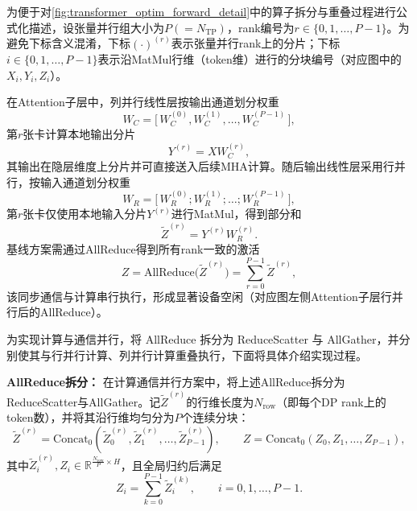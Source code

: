 为便于对\autoref{fig:transformer_optim_forward_detail}中的算子拆分与重叠过程进行公式化描述，设张量并行组大小为$P(=N_{\mathrm{TP}})$，rank编号为$r\in\{0,1,\ldots,P-1\}$。为避免下标含义混淆，下标$(\cdot)^{(r)}$表示张量并行rank上的分片；下标$i\in\{0,1,\ldots,P-1\}$表示沿MatMul行维（token维）进行的分块编号（对应图中的$X_i,Y_i,Z_i$）。

在Attention子层中，列并行线性层按输出通道划分权重
\begin{equation}
W_C=\big[\,W_C^{(0)},W_C^{(1)},\ldots,W_C^{(P-1)}\,\big],
\end{equation}
第$r$张卡计算本地输出分片
\begin{equation}
Y^{(r)}=XW_C^{(r)},
\end{equation}
其输出在隐层维度上分片并可直接送入后续MHA计算。随后输出线性层采用行并行，按输入通道划分权重
\begin{equation}
W_R=\big[\,W_R^{(0)};W_R^{(1)};\ldots;W_R^{(P-1)}\,\big],
\end{equation}
第$r$张卡仅使用本地输入分片$Y^{(r)}$进行MatMul，得到部分和
\begin{equation}
\widetilde{Z}^{(r)} = Y^{(r)}W_R^{(r)} .
\end{equation}
基线方案需通过AllReduce得到所有rank一致的激活
\begin{equation}
Z=\mathrm{AllReduce}\big(\widetilde{Z}^{(r)}\big)=\sum_{r=0}^{P-1}\widetilde{Z}^{(r)} ,
\end{equation}
该同步通信与计算串行执行，形成显著设备空闲（对应图左侧Attention子层行并行后的AllReduce）。


为实现计算与通信并行，将 AllReduce 拆分为 ReduceScatter 与 AllGather，并分别使其与行并行计算、列并行计算重叠执行，下面将具体介绍实现过程。


\vspace{0.5em}
\noindent
\textbf{AllReduce拆分：}
在计算通信并行方案中，将上述AllReduce拆分为ReduceScatter与AllGather。记$\widetilde{Z}^{(r)}$的行维长度为$N_{\mathrm{row}}$（即每个DP rank上的token数），并将其沿行维均匀分为$P$个连续分块：
\begin{equation}
\widetilde{Z}^{(r)}=\mathrm{Concat}_0\!\left(\widetilde{Z}^{(r)}_0,\widetilde{Z}^{(r)}_1,\ldots,\widetilde{Z}^{(r)}_{P-1}\right),\qquad
Z=\mathrm{Concat}_0\!\left(Z_0,Z_1,\ldots,Z_{P-1}\right),
\end{equation}
其中$\widetilde{Z}^{(r)}_i,Z_i\in\mathbb{R}^{\frac{N_{\mathrm{row}}}{P}\times H}$，且全局归约后满足
\begin{equation}
Z_i=\sum_{k=0}^{P-1}\widetilde{Z}^{(k)}_i,\qquad i=0,1,\ldots,P-1 .
\end{equation}

